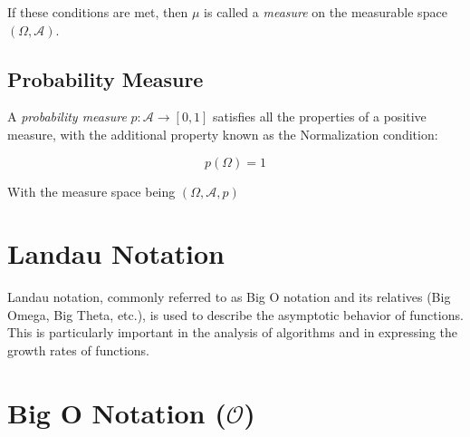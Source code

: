 If these conditions are met, then $\mu$ is called a \textit{measure} on the measurable space $(\Omega, \mathcal{A})$.

\subsection{Probability Measure}

A \textit{probability measure} $p: \mathcal{A} \to [0, 1]$ satisfies all the properties of a positive measure, with the additional property known as the Normalization condition:

\begin{equation*}
    p(\Omega) = 1
\end{equation*}

With the measure space being $(\Omega, \mathcal{A}, p)$



\section{Landau Notation}
Landau notation, commonly referred to as Big O notation and its relatives (Big Omega, Big Theta, etc.), is used to describe the asymptotic behavior of functions. This is particularly important in the analysis of algorithms and in expressing the growth rates of functions.

\section*{Big O Notation ($\mathcal{O}$)}

